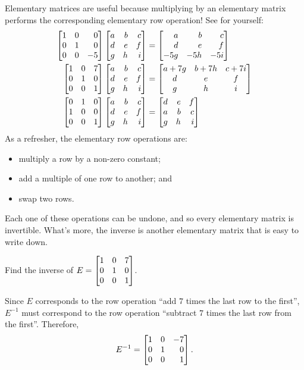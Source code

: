 Elementary matrices are useful because multiplying by an elementary matrix performs the corresponding elementary row operation! See for
yourself:
\begin{align*}
	\mat{1&0&0\\0&1&0\\0&0&-5}
	\mat{a&b&c\\d&e&f\\g&h&i}
	&=
	\mat{a&b&c\\d&e&f\\-5g&-5h&-5i}
\\
	\mat{1&0&7\\0&1&0\\0&0&1}
	\mat{a&b&c\\d&e&f\\g&h&i}
	&=
	\matc{a+7g&b+7h&c+7i\\d&e&f\\g&h&i}
\\
	\mat{0&1&0\\1&0&0\\0&0&1}
	\mat{a&b&c\\d&e&f\\g&h&i}
	&=
	\mat{d&e&f\\a&b&c\\g&h&i}
\end{align*}
As a refresher, the elementary row operations are:
\begin{itemize}
	\item multiply a row by a non-zero constant;
	\item add a multiple of one row to another; and
	\item swap two rows.
\end{itemize}
Each one of these operations can be undone, and so every elementary matrix is invertible. What's more, the inverse is
another elementary matrix that is
easy to write down.

\begin{example}
	Find the inverse of $E=
	\mat{1&0&7\\0&1&0\\0&0&1}$.

	Since $E$ corresponds to the row operation ``add $7$ times the last row to the first'', $E^{-1}$ must correspond
	to the row operation ``subtract $7$ times the last row from the first''. Therefore,
	\[
		E^{-1}=\mat{1&0&-7\\0&1&0\\0&0&1}.
	\]
\end{example}


